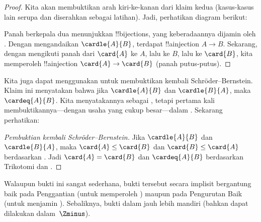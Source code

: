 \documentclass[../../../include/open-logic-section]{subfiles}
\begin{document}
\begin{proof}
Kita akan membuktikan arah kiri-ke-kanan dari klaim kedua (kasus-kasus lain
serupa dan diserahkan sebagai latihan). Jadi, perhatikan diagram berikut:
\begin{center}
\end{center}
Panah berkepala dua menunjukkan !!{bijection}s, yang keberadaannya dijamin
oleh . Dengan mengandaikan
$\cardle{A}{B}$, terdapat !!a{injection} $A\to B$. Sekarang, dengan
mengikuti panah dari $\card{A}$ ke $A$, lalu ke $B$, lalu ke $\card{B}$, kita
memperoleh !!a{injection} $\card{A} \to \card{B}$ (panah putus-putus).
\end{proof}\noindent Kita juga dapat menggunakan
 untuk membuktikan kembali
Schr\"{o}der--Bernstein. Klaim ini menyatakan bahwa jika
$\cardle{A}{B}$ dan $\cardle{B}{A}$, maka $\cardeq{A}{B}$. Kita menyatakannya
sebagai , tetapi pertama kali
membuktikannya---dengan usaha yang cukup besar---dalam
. Sekarang perhatikan:

\begin{proof}[Pembuktian kembali Schr\"oder--Bernstein]
Jika $\cardle{A}{B}$ dan $\cardle{B}{A}$, maka $\card{A} \leq \card{B}$
dan $\card{B} \leq \card{A}$ berdasarkan
. Jadi $\card{A} = \card{B}$ dan
$\cardeq{A}{B}$ berdasarkan Trikotomi dan
.
\end{proof}
\noindent
Walaupun bukti ini sangat sederhana, bukti tersebut secara implisit
bergantung baik pada Penggantian (untuk memperoleh
) maupun pada Pengurutan
Baik (untuk menjamin ). Sebaliknya, bukti
dalam  jauh lebih mandiri (bahkan dapat
dilakukan dalam~$\Zminus$).
\end{document}

